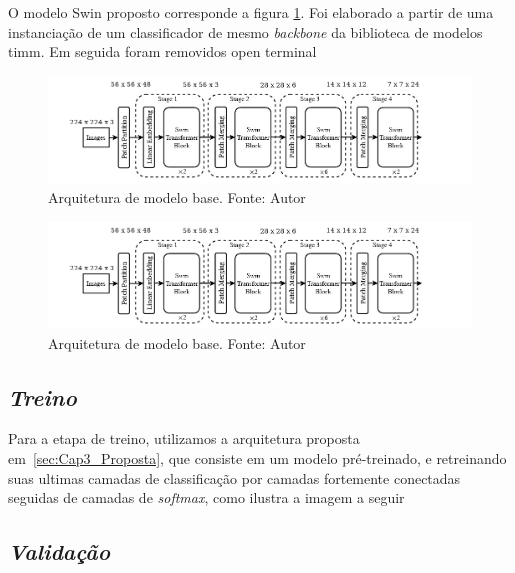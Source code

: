 O modelo Swin proposto corresponde a figura \ref{fig:Swin-T-Rsp}. Foi elaborado a partir de uma instanciação de um classificador de mesmo \textit{backbone} da biblioteca de modelos timm. Em seguida foram removidos open terminal

\begin{figure}[!ht]
    \centering
    \includegraphics[width=0.9\columnwidth]{Imagens/swin proposto.png}
    \caption{ Arquitetura de modelo base.
    Fonte: Autor}
   \label{fig:Swin-T-Rsp}
\end{figure}

\begin{figure}[!ht]
    \centering
    \includegraphics[width=0.9\columnwidth]{Imagens/swin proposto.png}
    \caption{ Arquitetura de modelo base.
    Fonte: Autor}
   \label{fig:ResNet-Rsp}
\end{figure}


\subsection{\textit{Treino}}\label{sec:Cap3_Treino}

Para a etapa de treino, utilizamos a arquitetura proposta em~\ref{sec:Cap3_Proposta}, que consiste em um modelo pré-treinado, e retreinando suas ultimas camadas de classificação por camadas fortemente conectadas seguidas de camadas de \textit{softmax}, como ilustra a imagem a seguir


\subsection{\textit{Validação}}\label{sec:Cap3_Validacao}

